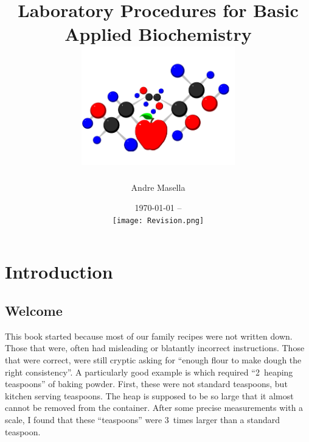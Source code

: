 \usepackage{fancyhdr}
\usepackage{textcomp}
\usepackage{graphicx}
\usepackage{ifthen}
\usepackage{multicol}
\usepackage{makeidx}
\usepackage{mdwlist}
\usepackage{xfrac}
\usepackage[utf8]{inputenc}
\usepackage[chapter]{tocbibind}
\usepackage[sf,medium,compact]{titlesec}
\setcounter{secnumdepth}{0}
\usepackage[pdftitle={Laboratory Procedures for Basic Applied Biochemistry},pdfauthor={Andre Masella},plainpages=false,pdfpagelabels,pdfborder=0 0 0]{hyperref}

\makeindex




\pagestyle{fancy}

\frontmatter
\thispagestyle{plain}

\title{Laboratory Procedures for Basic Applied Biochemistry \\
\includegraphics[width=0.5\textwidth]{CoverLogo}}
\author{Andre Masella}
\date{\today{} -- \\ \texttt{[image: Revision.png]}}
\maketitle

\tableofcontents

\chapter{Introduction}

\section{Welcome}
This book started because most of our family recipes were not written down. Those that were, often had misleading or blatantly incorrect instructions. Those that were correct, were still cryptic asking for ``enough flour to make dough the right consistency''. A particularly good example is  which required ``2~heaping teaspoons'' of baking powder. First, these were not standard teaspoons, but kitchen serving teaspoons. The heap is supposed to be so large that it almost cannot be removed from the container. After some precise measurements with a scale, I found that these ``teaspoons'' were 3~times larger than a standard teaspoon.

